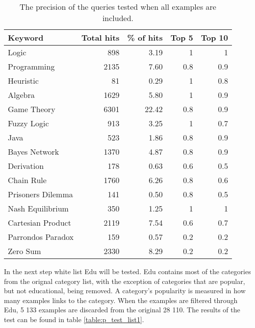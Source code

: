 \begin{table}[H]
\centering
\begin{tabular} {|| p{10em} | r | r | r | r ||} 
 \hline
 Keyword & Total hits & \% of hits & Top 5 & Top 10 \\ [0.5ex] 
 \hline

Logic & 898 & 3.19 & 1 & 1 \\
Programming & 2135 & 7.60 & 0.8 & 0.9 \\
Heuristic & 81 & 0.29 & 1 & 0.8 \\
Algebra & 1629 & 5.80 & 1 & 0.9 \\
Game Theory & 6301 & 22.42 & 0.8 & 0.9 \\
\hline
Fuzzy Logic & 913 & 3.25 & 1 & 0.7 \\
Java & 523 & 1.86 & 0.8 & 0.9 \\
Bayes Network & 1370 & 4.87 & 0.8 & 0.9 \\
Derivation & 178 & 0.63 & 0.6 & 0.5 \\
\hline
Chain Rule & 1760 & 6.26 & 0.8 & 0.6 \\
Prisoners Dilemma & 141 & 0.50 & 0.8 & 0.5 \\
Nash Equilibrium & 350 & 1.25 & 1 & 1 \\
Cartesian Product & 2119 & 7.54 & 0.6 & 0.7 \\
Parrondos Paradox & 159 & 0.57 &  0.2 & 0.2 \\
Zero Sum & 2330 & 8.29 & 0.2 & 0.2 \\

 \hline
\end{tabular}
\caption{The precision of the queries tested when all examples are included.}
\label{table:p_test_no-list}
\end{table}

In the next step white list Edu will be tested. Edu contains most of the categories from the orignal category list, with the exception of categories that are popular, but not educational, being removed. A category's popularity is measured in how many examples links to the category. When the examples are filtered through Edu, 5 133 examples are discarded from the original 28 110. The results of the test can be found in table \ref{table:p_test_list1}.

